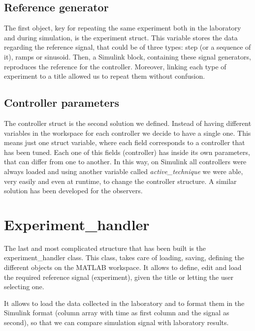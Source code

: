 \documentclass{report}
\begin{document}
\subsection{Reference generator}
The first object, key for repeating the same experiment both in the laboratory and during simulation, is the experiment struct. 
This variable stores the data regarding the reference signal, that could be of three types: step (or a sequence of it), ramps or sinusoid. Then, a Simulink block, containing these signal generators, reproduces the reference for the controller. Moreover, linking each type of experiment to a title allowed us to repeat them without confusion. 

\subsection{Controller parameters}
The controller struct is the second solution we defined. Instead of having different variables in the workspace for each controller we decide to have a single one. This means just one struct variable, where each field corresponds to a controller that has been tuned. Each one of this fields (controller) has inside its own parameters, that can differ from one to another. 
In this way, on Simulink all controllers were always loaded and using another variable called \textit{active\_technique} we were able, very easily and even at runtime, to change the controller structure.  
A similar solution has been developed for the observers. 

\section{Experiment\_handler}
The last and most complicated structure that has been built is the experiment\_handler class. This class, takes care of loading, saving, defining the different objects on the MATLAB workspace. 
It allows to define, edit and load the required reference signal (experiment), given the title or letting the user selecting one.

It allows to load the data collected in the laboratory and to format them in the Simulink format (column array with time as first column and the signal as second), so that we can compare simulation signal with laboratory results. 
\end{document}
